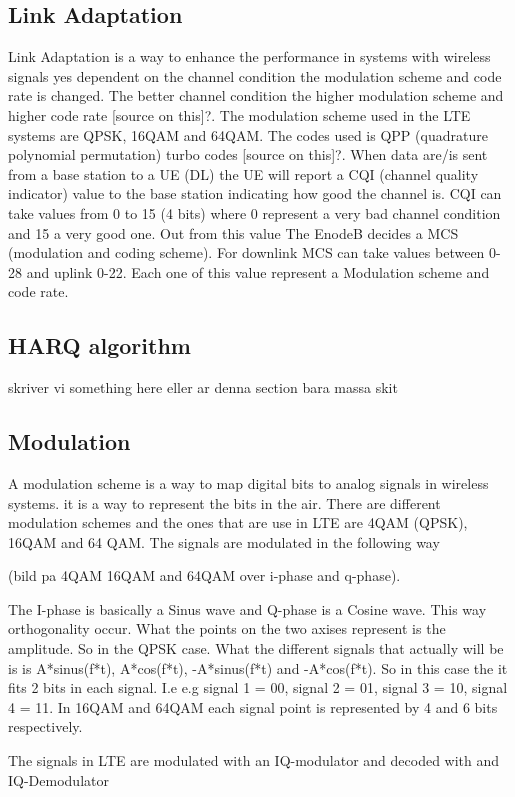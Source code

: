 \documentclass[cropmarks, frame, english]{idamasterthesis}
\begin{document}
\subsection{Link Adaptation}
Link Adaptation is a way to enhance the performance in systems with wireless signals yes dependent on the channel condition the modulation scheme and code rate is changed. The better channel condition the higher modulation scheme and higher code rate [source on this]?. The modulation scheme used in the LTE systems are QPSK, 16QAM and 64QAM. The codes used is QPP (quadrature polynomial permutation) turbo codes [source on this]?. When data are/is sent from a base station to a UE (DL) the UE will report a CQI (channel quality indicator) value to the base station indicating how good the channel is. CQI can take values from 0 to 15 (4 bits) where 0 represent a very bad channel condition and 15 a very good one. Out from this value The EnodeB decides a MCS (modulation and coding scheme). For downlink MCS can take values between 0-28 and uplink 0-22. Each one of this value represent a Modulation scheme and code rate. 

\subsection{HARQ algorithm}
skriver vi something here eller ar denna section bara massa skit

\subsection{Modulation}
A modulation scheme is a way to map digital bits to analog signals in wireless systems. it is a way to represent the bits in the air.
There are different modulation schemes and the ones that are use in LTE are 4QAM (QPSK), 16QAM and 64 QAM. The signals are modulated in the following way 

(bild pa 4QAM 16QAM and 64QAM over i-phase and q-phase). 
 
The I-phase is basically a Sinus wave and Q-phase is a Cosine wave. This way orthogonality occur. What the points on the two axises represent is the amplitude. So in the QPSK case. What the different signals that actually will be is
is A*sinus(f*t), A*cos(f*t), -A*sinus(f*t) and -A*cos(f*t). So in this case the it fits 2 bits in each signal. I.e e.g signal 1 = 00, signal 2 = 01, signal 3 = 10, signal 4 = 11. In 16QAM and 64QAM each signal point is represented by 4 and 6 bits respectively.

The signals in LTE are modulated with an IQ-modulator and decoded with and IQ-Demodulator
\end{document}
